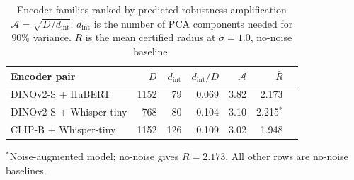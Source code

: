 \begin{table}[t]
\centering
\caption{Encoder families ranked by predicted robustness
amplification $\mathcal{A}=\sqrt{D/d_\text{int}}$.
$d_\text{int}$ is the number of PCA components needed for 90\%
variance. $\bar{R}$ is the mean certified radius at $\sigma=1.0$,
no-noise baseline.}
\label{tab:encoder_scaling}
\small
\setlength{\tabcolsep}{5pt}
\begin{tabular}{lrrrrrr}
\hline
Encoder pair & $D$ & $d_\text{int}$ & $d_\text{int}/D$ &
  $\mathcal{A}$ & $\bar{R}$ \\
\hline
DINOv2-S + HuBERT       & 1152 &  79 & 0.069 & 3.82 & 2.173 \\
DINOv2-S + Whisper-tiny &  768 &  80 & 0.104 & 3.10 & 2.215$^*$ \\
CLIP-B + Whisper-tiny   & 1152 & 126 & 0.109 & 3.02 & 1.948 \\
\hline
\end{tabular}
\vspace{2pt}

{\footnotesize $^*$Noise-augmented model; no-noise gives $\bar{R}=2.173$.
All other rows are no-noise baselines.}
\end{table}



%
%



